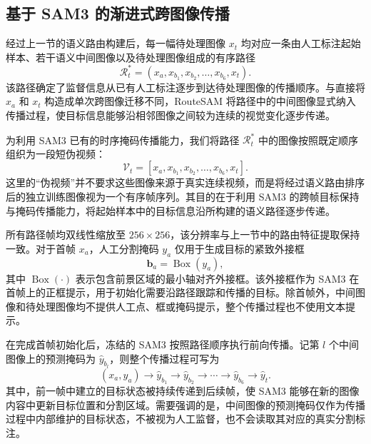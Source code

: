 \documentclass[UTF8,a4paper,10pt]{ctexart}
\begin{document}
\subsection{基于 SAM3 的渐进式跨图像传播}
\label{sec:progressive-sam3-propagation-zh}

经过上一节的语义路由构建后，每一幅待处理图像 $x_t$ 均对应一条由人工标注起始样本、若干语义中间图像以及待处理图像组成的有序路径
\begin{equation}
\mathcal{R}_t^{*}
=
\left(
x_a,
x_{b_1},
x_{b_2},
\ldots,
x_{b_6},
x_t
\right).
\end{equation}
该路径确定了监督信息从已有人工标注逐步到达待处理图像的传播顺序。与直接将 $x_a$ 和 $x_t$ 构造成单次跨图像迁移不同，RouteSAM 将路径中的中间图像显式纳入传播过程，使目标信息能够沿相邻图像之间较为连续的视觉变化逐步传递。

为利用 SAM3 已有的时序掩码传播能力，我们将路径 $\mathcal{R}_t^{*}$ 中的图像按照既定顺序组织为一段短伪视频：
\begin{equation}
\mathcal{V}_t
=
\left[
x_a,
x_{b_1},
x_{b_2},
\ldots,
x_{b_6},
x_t
\right].
\end{equation}
这里的“伪视频”并不要求这些图像来源于真实连续视频，而是将经过语义路由排序后的独立训练图像视为一个有序帧序列。其目的在于利用 SAM3 的跨帧目标保持与掩码传播能力，将起始样本中的目标信息沿所构建的语义路径逐步传递。

所有路径帧均双线性缩放至 $256\times256$，该分辨率与上一节中的路由特征提取保持一致。对于首帧 $x_a$，人工分割掩码 $y_a$ 仅用于生成目标的紧致外接框
\begin{equation}
\mathbf{b}_a
=
\operatorname{Box}(y_a),
\end{equation}
其中 $\operatorname{Box}(\cdot)$ 表示包含前景区域的最小轴对齐外接框。该外接框作为 SAM3 在首帧上的正框提示，用于初始化需要沿路径跟踪和传播的目标。除首帧外，中间图像和待处理图像均不提供人工点、框或掩码提示，整个传播过程也不使用文本提示。

在完成首帧初始化后，冻结的 SAM3 按照路径顺序执行前向传播。记第 $l$ 个中间图像上的预测掩码为
$\widehat{y}_{b_l}$，则整个传播过程可写为
\begin{equation}
(x_a,y_a)
\rightarrow
\widehat{y}_{b_1}
\rightarrow
\widehat{y}_{b_2}
\rightarrow
\cdots
\rightarrow
\widehat{y}_{b_6}
\rightarrow
\widehat{y}_{t}.
\end{equation}
其中，前一帧中建立的目标状态被持续传递到后续帧，使 SAM3 能够在新的图像内容中更新目标位置和分割区域。需要强调的是，中间图像的预测掩码仅作为传播过程中内部维护的目标状态，不被视为人工监督，也不会读取其对应的真实分割标注。
\end{document}
